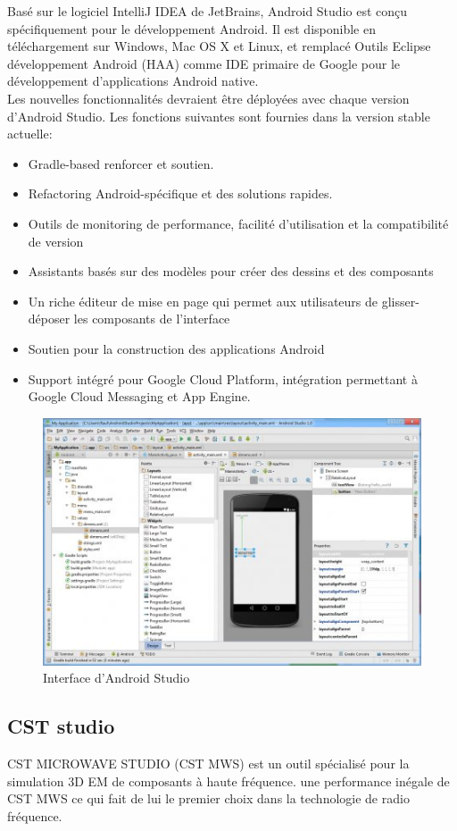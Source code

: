 \documentclass[11pt, a4paper, twoside]{book}
\begin{document}
Basé sur le logiciel IntelliJ IDEA de JetBrains, Android Studio est conçu spécifiquement pour le développement Android. Il est disponible en téléchargement sur Windows, Mac OS X et Linux, et remplacé Outils Eclipse développement Android (HAA) comme IDE primaire de Google pour le développement d'applications Android native.\\


Les nouvelles fonctionnalités devraient être déployées avec chaque version d'Android Studio. Les fonctions suivantes sont fournies dans la version stable actuelle: 
\begin{itemize}
\item Gradle-based  renforcer et soutien.
\item Refactoring Android-spécifique et des solutions rapides.
\item Outils de monitoring de performance, facilité d'utilisation et la compatibilité de version 
\item Assistants basés sur des modèles pour créer des dessins et des composants 
\item Un riche éditeur de mise en page qui permet aux utilisateurs de glisser-déposer les composants de l'interface
\item Soutien pour la construction des applications Android
\item Support intégré pour Google Cloud Platform, intégration permettant à Google Cloud Messaging et App Engine.
\end{itemize}
\begin{figure}[H]
\centering
\includegraphics[width=\textwidth]{as}
\caption{Interface d'Android Studio}
\end{figure}

\subsection{CST studio}
CST MICROWAVE STUDIO (CST MWS) est un outil spécialisé pour la simulation 3D EM de composants à haute fréquence. une performance inégale de CST MWS  ce qui fait de lui le premier choix dans la technologie de radio fréquence.\\
\end{document}
